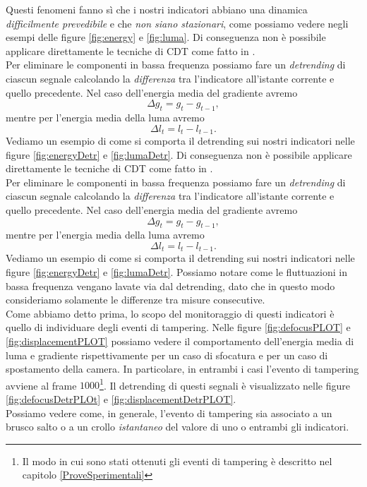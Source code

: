 Questi fenomeni fanno s\`i che i nostri indicatori abbiano una dinamica \textit{difficilmente prevedibile} e che \textit{non siano stazionari}, come possiamo vedere negli esempi delle figure \ref{fig:energy} e \ref{fig:luma}.
Di conseguenza non \`e possibile applicare direttamente le tecniche di CDT come fatto in \cite{alippi2010detecting}. \\
Per eliminare le componenti in bassa frequenza possiamo fare un \textit{detrending} di ciascun segnale calcolando la \textit{differenza} tra l'indicatore all'istante corrente e quello precedente.
Nel caso dell'energia media del gradiente avremo
\[\Delta g_t = g_t - g_{t-1},\]
mentre per l'energia media della luma avremo
\[\Delta l_t = l_t - l_{t -1}.\]
Vediamo un esempio di come si comporta il detrending sui nostri indicatori nelle figure \ref{fig:energyDetr} e \ref{fig:lumaDetr}.  
Di conseguenza non \`e possibile applicare direttamente le tecniche di CDT come fatto in \cite{alippi2010detecting}. \\
Per eliminare le componenti in bassa frequenza possiamo fare un \textit{detrending} di ciascun segnale calcolando la \textit{differenza} tra l'indicatore all'istante corrente e quello precedente.
Nel caso dell'energia media del gradiente avremo
\[\Delta g_t = g_t - g_{t-1},\]
mentre per l'energia media della luma avremo
\[\Delta l_t = l_t - l_{t -1}.\]
Vediamo un esempio di come si comporta il detrending sui nostri indicatori nelle figure \ref{fig:energyDetr} e \ref{fig:lumaDetr}.  
Possiamo notare come le fluttuazioni in bassa frequenza vengano lavate via dal detrending, dato che in questo modo consideriamo solamente le differenze tra misure consecutive.\\
Come abbiamo detto prima, lo scopo del monitoraggio di questi indicatori \`e quello di individuare degli eventi di tampering.
Nelle figure \ref{fig:defocusPLOT} e \ref{fig:displacementPLOT} possiamo vedere il comportamento dell'energia media di luma e gradiente rispettivamente per un caso di sfocatura e per un caso di spostamento della camera.  
In particolare, in entrambi i casi l'evento di tampering avviene al frame $1000$\footnote{Il modo in cui sono stati ottenuti gli eventi di tampering \`e descritto nel capitolo \ref{ProveSperimentali}}.
Il detrending di questi segnali \`e visualizzato nelle figure \ref{fig:defocusDetrPLOt} e \ref{fig:displacementDetrPLOT}.\\
\noindent Possiamo vedere come, in generale, l'evento di tampering sia associato a un brusco salto o a un crollo \textit{istantaneo} del valore di uno o entrambi gli indicatori.
